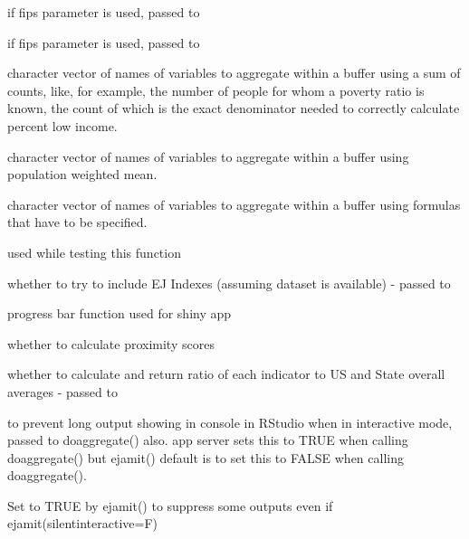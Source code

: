 \documentclass[a4paper]{book}
\begin{document}
\begin{Arguments}
\begin{ldescription}
\item[\code{in\_shiny}] if fips parameter is used, passed to 

\item[\code{need\_blockwt}] if fips parameter is used, passed to 

\item[\code{countcols}] character vector of names of variables to aggregate within a buffer using a sum of counts,
like, for example, the number of people for whom a poverty ratio is known,
the count of which is the exact denominator needed to correctly calculate percent low income.

\item[\code{popmeancols}] character vector of names of variables to aggregate within a buffer using population weighted mean.

\item[\code{calculatedcols}] character vector of names of variables to aggregate within a buffer using formulas that have to be specified.

\item[\code{testing}] used while testing this function

\item[\code{include\_ejindexes}] whether to try to include EJ Indexes (assuming dataset is available) - passed to 

\item[\code{updateProgress}] progress bar function used for shiny app

\item[\code{need\_proximityscore}] whether to calculate proximity scores

\item[\code{calculate\_ratios}] whether to calculate and return ratio of each indicator to US and State overall averages - passed to 

\item[\code{silentinteractive}] to prevent long output showing in console in RStudio when in interactive mode,
passed to doaggregate() also. app server sets this to TRUE when calling doaggregate() but
ejamit() default is to set this to FALSE when calling doaggregate().

\item[\code{called\_by\_ejamit}] Set to TRUE by ejamit() to suppress some outputs even if ejamit(silentinteractive=F)


\end{ldescription}
\end{Arguments}
\end{document}
